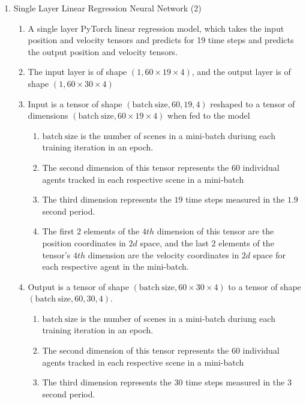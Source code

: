 \documentclass{article}
\begin{document}
\begin{enumerate}
        \item Single Layer Linear Regression Neural Network (2) 
        \label{itm:2}
        \begin{enumerate}
          \item A single layer PyTorch linear regression model, which takes the input position and velocity tensors and predicts
                for 19 time steps and predicts the output position and velocity tensors.
          \item The input layer is of shape $\left(1, 60 \times 19 \times 4\right)$, and the output layer is of shape 
                $\left(1, 60 \times 30 \times 4\right)$
          \item Input is a tensor of shape $\left( \mathrm{batch\ size}, 60, 19, 4 \right)$ reshaped
                to a tensor of dimensions $\left( \mathrm{batch\ size}, 60 \times 19 \times 4 \right)$ when fed to the model
          \begin{enumerate}
                \item $\mathrm{batch\ size}$ is the number of scenes in a mini-batch duriung each training iteration in an epoch.
                \item The second dimension of this tensor represents the $60$ individual agents tracked in each respective scene 
                      in a mini-batch 
                \item The third dimension represents the $19$ time steps measured in the $1.9$ second period.
                \item The first $2$ elements of the $4th$ dimension of this tensor are the position coordinates in $2d$ space, and the last $2$ elements of the 
                tensor's $4th$ dimension are the velocity coordinates in $2d$ space for each respective agent in the mini-batch.
          \end{enumerate}
          \item Output is a tensor of shape $\left( \mathrm{batch\ size}, 60 \times 30 \times 4 \right)$ to a tensor of 
                shape $\left( \mathrm{batch\ size}, 60, 30, 4 \right)$.
          \begin{enumerate}
            \item $\mathrm{batch\ size}$ is the number of scenes in a mini-batch duriung each training iteration in an epoch.
            \item The second dimension of this tensor represents the $60$ individual agents tracked in each respective scene 
                  in a mini-batch 
            \item The third dimension represents the $30$ time steps measured in the $3$ second period.

\end{enumerate}
\end{enumerate}
\end{enumerate}
\end{document}

